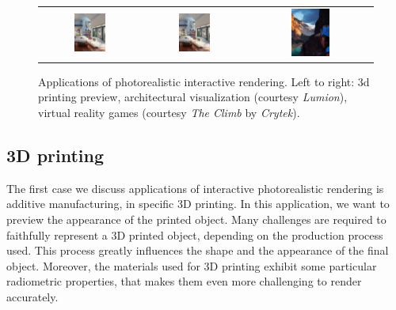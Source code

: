 \begin{figure}
\centering
\begin{tabular}{@{}c@{}c@{}c@{}}
	 \includegraphics[draft,width=0.33\textwidth]{figures/lumion-crop.jpg} & 	 \includegraphics[width=0.33\textwidth]{figures/lumion-crop.jpg} 
& 	 \includegraphics[width=0.33\textwidth]{figures/the-climb-crop.jpg} \\
\end{tabular}
\caption{Applications of photorealistic interactive rendering. Left to right: 3d printing preview, architectural visualization (courtesy \emph{Lumion}), virtual reality games (courtesy \emph{The Climb} by \emph{Crytek}).} 
\label{fig:applications}
\end{figure}

\subsection{3D printing}
The first case we discuss applications of interactive photorealistic rendering is additive manufacturing, in specific 3D printing. In this application, we want to preview the appearance of the printed object. Many challenges are required to faithfully represent a 3D printed object, depending on the production process used. This process greatly influences the shape and the appearance of the final object. Moreover, the materials used for 3D printing exhibit some particular radiometric properties, that makes them even more challenging to render accurately. 

